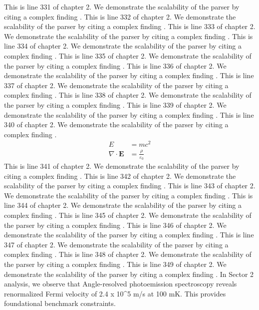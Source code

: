 This is line 331 of chapter 2. We demonstrate the scalability of the parser by citing a complex finding \cite{ref2_331}.
This is line 332 of chapter 2. We demonstrate the scalability of the parser by citing a complex finding \cite{ref2_332}.
This is line 333 of chapter 2. We demonstrate the scalability of the parser by citing a complex finding \cite{ref2_333}.
This is line 334 of chapter 2. We demonstrate the scalability of the parser by citing a complex finding \cite{ref2_334}.
This is line 335 of chapter 2. We demonstrate the scalability of the parser by citing a complex finding \cite{ref2_335}.
This is line 336 of chapter 2. We demonstrate the scalability of the parser by citing a complex finding \cite{ref2_336}.
This is line 337 of chapter 2. We demonstrate the scalability of the parser by citing a complex finding \cite{ref2_337}.
This is line 338 of chapter 2. We demonstrate the scalability of the parser by citing a complex finding \cite{ref2_338}.
This is line 339 of chapter 2. We demonstrate the scalability of the parser by citing a complex finding \cite{ref2_339}.
This is line 340 of chapter 2. We demonstrate the scalability of the parser by citing a complex finding \cite{ref2_340}.
\begin{align*}
  E &= mc^2 \\
  \nabla \cdot \mathbf{E} &= \frac{\rho}{\varepsilon_0}
\end{align*}
This is line 341 of chapter 2. We demonstrate the scalability of the parser by citing a complex finding \cite{ref2_341}.
This is line 342 of chapter 2. We demonstrate the scalability of the parser by citing a complex finding \cite{ref2_342}.
This is line 343 of chapter 2. We demonstrate the scalability of the parser by citing a complex finding \cite{ref2_343}.
This is line 344 of chapter 2. We demonstrate the scalability of the parser by citing a complex finding \cite{ref2_344}.
This is line 345 of chapter 2. We demonstrate the scalability of the parser by citing a complex finding \cite{ref2_345}.
This is line 346 of chapter 2. We demonstrate the scalability of the parser by citing a complex finding \cite{ref2_346}.
This is line 347 of chapter 2. We demonstrate the scalability of the parser by citing a complex finding \cite{ref2_347}.
This is line 348 of chapter 2. We demonstrate the scalability of the parser by citing a complex finding \cite{ref2_348}.
This is line 349 of chapter 2. We demonstrate the scalability of the parser by citing a complex finding \cite{ref2_349}.
In Sector 2 analysis, we observe that Angle-resolved photoemission spectroscopy reveals renormalized Fermi velocity of 2.4 x 10^5 m/s at 100 mK. This provides foundational benchmark constraints.
